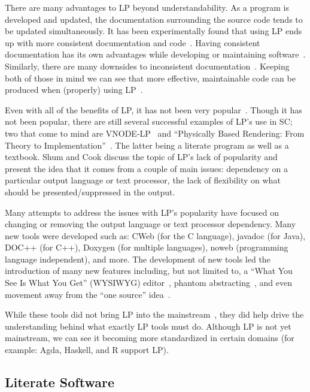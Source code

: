 \documentclass{article}
\begin{document}
There are many advantages to LP beyond understandability. As a program is developed and updated, the documentation surrounding the source code tends to be updated simultaneously. It has been experimentally found that using LP ends up with more consistent documentation and code~\cite{ShumAndCook1993}. Having consistent documentation has its own advantages while developing or maintaining software~\cite{Hyman1990, Kotula2000}. Similarly, there are many downsides to inconsistent documentation~\cite{Kotula2000,Thimbleby1986}. Keeping both of those in mind we can see that more effective, maintainable code can be produced when (properly) using LP~\cite{PieterseKourieAndBoake2004}.

Even with all of the benefits of LP, it has not been very popular~\cite{ShumAndCook1993}. Though it has not been popular, there are still several successful examples of LP's use in SC; two that come to mind are VNODE-LP~\cite{Nedialkov2006} and ``Physically Based Rendering: From Theory to Implementation''~\cite{PharrAndHumphreys2004}. The latter being a literate program as well as a textbook. Shum and Cook discuss the topic of LP's lack of popularity and present the idea that it comes from a couple of main issues: dependency on a particular output language or text processor, the lack of flexibility on what should be presented/suppressed in the output.

Many attempts to address the issues with LP's popularity have focused on changing or
removing the output language or text processor dependency. Many new tools were developed such as: CWeb (for the C language), javadoc (for Java), DOC++ (for C++), Doxygen (for multiple languages), noweb (programming language independent), and more. The development of new tools led the introduction of many new features including, but not limited to, a ``What You See Is What You Get'' (WYSIWYG) editor~\cite{FritzsonGunnarssonAndJirstrand2002}, phantom abstracting~\cite{ShumAndCook1993}, and even movement away from the ``one source'' idea~\cite{Simonis2003}.

While these tools did not bring LP into the mainstream~\cite{Ramsey1994}, they did help drive the understanding behind what exactly LP tools must do. Although LP is not yet mainstream, we can see it becoming more standardized in certain domains (for example: Agda, Haskell, and R support LP).

\subsection{Literate Software}
\end{document}
